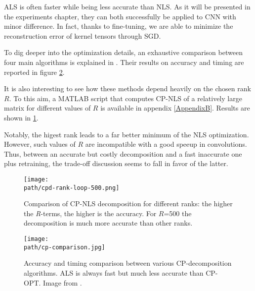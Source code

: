 ALS is often faster while being less accurate than NLS. As it will be presented in the experiments chapter, they can both successfully be applied to CNN with minor difference. In fact, thanks to fine-tuning, we are able to minimize the reconstruction error of kernel tensors through SGD. 

To dig deeper into the optimization details, an exhaustive comparison between four main algorithms is explained in \parencite{WCPD-talk}. Their results on accuracy and timing are reported in figure \ref{fig:cp-comparison}.
\newline 

It is also interesting to see how these methods depend heavily on the chosen rank $R$. To this aim, a MATLAB script that computes CP-NLS of a relatively large matrix for different values of $R$ is available in appendix \ref{AppendixB}. Results are shown in \ref{fig:rank-loop}. 

Notably, the higest rank leads to a far better minimum of the NLS optimization. However, such values of $R$ are incompatible with a good speeup in convolutions. Thus, between an accurate but costly decomposition and a fast inaccurate one plus retraining, the trade-off discussion seems to fall in favor of the latter.

\begin{figure}[h!]
 \centering
 \texttt{[image: \\path/cpd-rank-loop-500.png]} 
 \caption{Comparison of CP-NLS decomposition for different ranks: the higher the \emph{R}-terms, the higher is the accuracy. For $R$=500 the decomposition is much more accurate than other ranks.}
 \label{fig:rank-loop}
\end{figure}

\begin{figure}[h!]
 \centering
 \texttt{[image: \\path/cp-comparison.jpg]} 
 \caption{Accuracy and timing comparison between various CP-decomposition algorithms. ALS is always fast but much less accurate than CP-OPT. Image from \parencite{WCPD-talk}.}
 \label{fig:cp-comparison}
\end{figure}

\newpage
